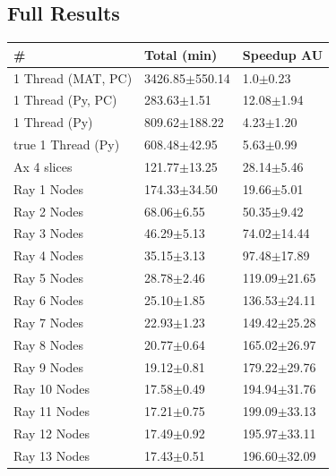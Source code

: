 \documentclass[12pt, a4paper]{article}
\begin{document}
\begin{appendices}

\section{Full Results}

\begin{table}[H]
    \centering
    \begin{tabular}{|l|l|l|}
    \hline
    \#                 & Total (min)        & Speedup AU       \\ \hline
    1 Thread (MAT, PC) & 3426.85$\pm$550.14 & 1.0$\pm$0.23     \\ \hline
    1 Thread (Py, PC)  & 283.63$\pm$1.51    & 12.08$\pm$1.94   \\ \hline
    1 Thread (Py)      & 809.62$\pm$188.22  & 4.23$\pm$1.20    \\ \hline
    true 1 Thread (Py) & 608.48$\pm$42.95   & 5.63$\pm$0.99    \\ \hline
    Ax 4 slices        & 121.77$\pm$13.25   & 28.14$\pm$5.46   \\ \hline
    Ray 1 Nodes        & 174.33$\pm$34.50   & 19.66$\pm$5.01   \\ \hline
    Ray 2 Nodes        & 68.06$\pm$6.55     & 50.35$\pm$9.42   \\ \hline
    Ray 3 Nodes        & 46.29$\pm$5.13     & 74.02$\pm$14.44  \\ \hline
    Ray 4 Nodes        & 35.15$\pm$3.13     & 97.48$\pm$17.89  \\ \hline
    Ray 5 Nodes        & 28.78$\pm$2.46     & 119.09$\pm$21.65 \\ \hline
    Ray 6 Nodes        & 25.10$\pm$1.85     & 136.53$\pm$24.11 \\ \hline
    Ray 7 Nodes        & 22.93$\pm$1.23     & 149.42$\pm$25.28 \\ \hline
    Ray 8 Nodes        & 20.77$\pm$0.64     & 165.02$\pm$26.97 \\ \hline
    Ray 9 Nodes        & 19.12$\pm$0.81     & 179.22$\pm$29.76 \\ \hline
    Ray 10 Nodes       & 17.58$\pm$0.49     & 194.94$\pm$31.76 \\ \hline
    Ray 11 Nodes       & 17.21$\pm$0.75     & 199.09$\pm$33.13 \\ \hline
    Ray 12 Nodes       & 17.49$\pm$0.92     & 195.97$\pm$33.11 \\ \hline
    Ray 13 Nodes       & 17.43$\pm$0.51     & 196.60$\pm$32.09 \\ \hline

\end{tabular}
\end{table}
\end{appendices}
\end{document}
